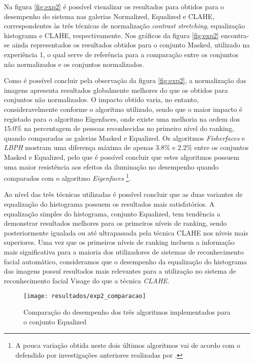 Na figura \ref{fig:exp2} é possível visualizar os resultados para obtidos para o desempenho do sistema nas galerias Normalized, Equalized e CLAHE, correspondentes às três técnicas de normalização \textit{contrast stretching}, equalização histograma e CLAHE, respectivamente. Nos gráficos da figura \ref{fig:exp2} encontra-se ainda representados os resultados obtidos para o conjunto Masked, utilizado na experiência 1, o qual serve de referência para a comparação entre os conjuntos não normalizados e os conjuntos normalizados.

Como é possível concluir pela observação da figura \ref{fig:exp2}, a normalização das imagens apresenta resultados globalmente melhores do que os obtidos para conjuntos não normalizados. O impacto obtido varia, no entanto, consideravelmente conforme o algoritmo utilizado, sendo que o maior impacto é registado para o algoritmo Eigenfaces, onde existe uma melhoria na ordem dos 15.0\% na percentagem de pessoas reconhecidas no primeiro nível do ranking, quando comparadas as galerias Masked e Equalized. Os algoritmos \textit{Fisherfaces} e \textit{LBPH} mostram uma diferença máxima de apenas 3.8\% e 2.2\% entre os conjuntos Masked e Equalized, pelo que é possível concluir que estes algoritmos possuem uma maior resistência aos efeitos da iluminação no desempenho quando comparados com o algoritmo \textit{Eigenfaces} \footnote{A pouca variação obtida neste dois últimos algoritmos vai de acordo com o defendido por investigações anteriores realizadas por \cite{ahonen2004face}.}.

Ao nível das três técnicas utilizadas é possível concluir que as duas variantes de equalização do histograma possuem os resultados mais satisfatórios. A equalização simples do histograma, conjunto Equalized, tem tendência a demonstrar resultados melhores para os primeiros níveis de ranking, sendo posteriormente igualada ou até ultrapassada pela técnica CLAHE nos níveis mais superiores. Uma vez que os primeiros níveis de ranking incluem a informação mais significativa para a maioria dos utilizadores de sistemas de reconhecimento facial automático, consideramos que o desempenho da equalização do histograma das imagens possuí resultados mais relevantes para a utilização no sistema de reconhecimento facial Visage do que a técnica \textit{CLAHE}.

\begin{figure}[ht]
  \begin{center}
    \leavevmode
    \texttt{[image: resultados/exp2\_comparacao]}
    \caption{Comparação do desempenho dos três algoritmos implementados para o conjunto Equalized}
    \label{fig:exp2_comaparacao}
  \end{center}
\end{figure}

